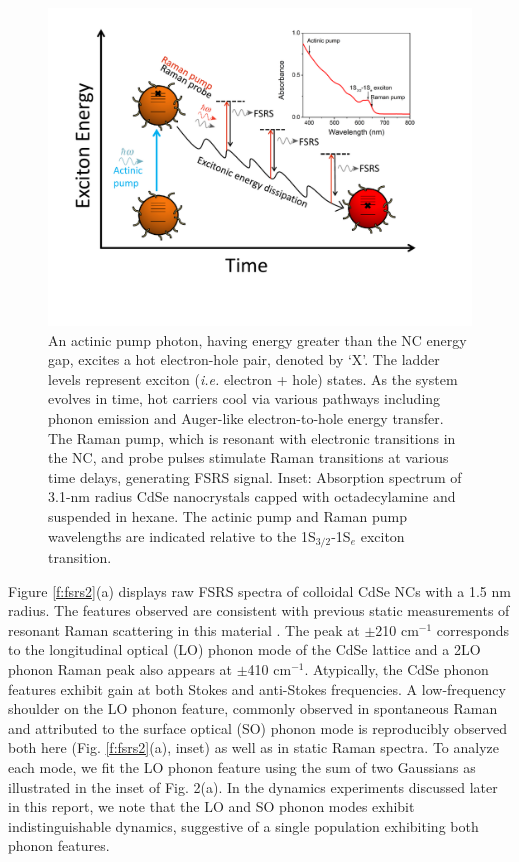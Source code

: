 \begin{figure}
\begin{center}
\includegraphics[width=\textwidth]{./Chapter2/fsrs1.pdf}
\caption[Diagram demonstrating the application of FSRS to exciton cooling in NCs.]{An actinic pump photon, having energy greater than the NC energy gap, excites a hot electron-hole pair, denoted by ‘X’.  The ladder levels represent exciton (\emph{i.e.} electron + hole) states.  As the system evolves in time, hot carriers cool via various pathways including phonon emission and Auger-like electron-to-hole energy transfer.  The Raman pump, which is resonant with electronic transitions in the NC, and probe pulses stimulate Raman transitions at various time delays, generating FSRS signal. Inset: Absorption spectrum of 3.1-nm radius CdSe nanocrystals capped with octadecylamine and suspended in hexane.  The actinic pump and Raman pump wavelengths are indicated relative to the 1S$_{3/2}$-1S$_e$ exciton transition.}
\label{f:fsrs1}
\end{center}
\end{figure}

Figure \ref{f:fsrs2}(a) displays raw FSRS spectra of colloidal CdSe NCs with a 1.5 nm radius. The features observed are consistent with previous static measurements of resonant Raman scattering in this material \cite{aliviresodepolar}.  The peak at $\pm$210 cm$^{-1}$ corresponds to the longitudinal optical (LO) phonon mode of the CdSe lattice and a 2LO phonon Raman peak also appears at $\pm$410 cm$^{-1}$.  Atypically, the CdSe phonon features exhibit gain at both Stokes and anti-Stokes frequencies.  A low-frequency shoulder on the LO phonon feature, commonly observed in spontaneous Raman and attributed to the surface optical (SO) phonon mode \cite{aliviresodepolar, DzhaganPhonon} is reproducibly observed both here (Fig. \ref{f:fsrs2}(a), inset) as well as in static Raman spectra.  To analyze each mode, we fit the LO phonon feature using the sum of two Gaussians as illustrated in the inset of Fig. 2(a). In the dynamics experiments discussed later in this report, we note that the LO and SO phonon modes exhibit indistinguishable dynamics, suggestive of a single population exhibiting both phonon features. \par

